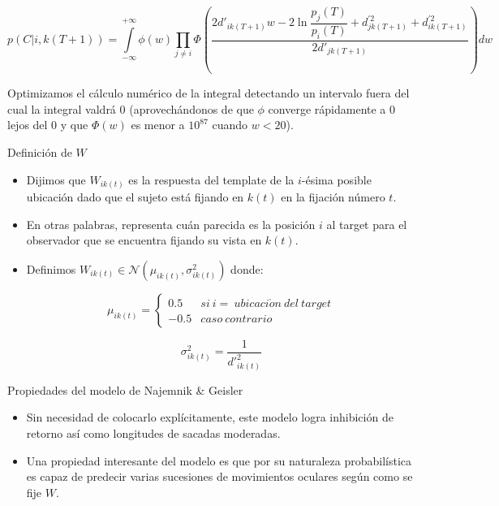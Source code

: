 \documentclass[compress]{beamer}
\begin{document}
\begin{frame}


{\footnotesize
$$p(C | i, k(T+1)) = \int\limits_{-\infty}^{+\infty}\phi(w) \prod\limits_{j \neq i} \Phi\left(\dfrac{2d'_{ik(T+1)} w -2\ln\dfrac{p_j(T)}{p_i(T)} + d_{jk(T+1)}^{\prime 2} + d_{ik(T+1)}^{\prime 2}}{2d'_{jk(T+1)}} \right) dw$$}

Optimizamos el cálculo numérico de la integral detectando un intervalo fuera del cual la integral valdrá 0 (aprovechándonos de que $\phi$ converge rápidamente a 0 lejos del 0 y que $\Phi(w)$ es menor a $10^{87}$ cuando $w < 20$).
\end{frame}

\begin{frame}{Definición de $W$}
\begin{itemize}
\item Dijimos que $W_{ik(t)}$ es la respuesta del template de la $i$-ésima posible ubicación dado que el sujeto está fijando en $k(t)$ en la fijación número $t$. 

\item En otras palabras, representa cuán parecida es la posición $i$ al target para el observador que se encuentra fijando su vista en $k(t)$. 
\item Definimos $W_{ik(t)} \in \mathcal{N}(\mu_{ik(t)}, \sigma^2_{ik(t)})$ donde:

$$ \mu_{ik(t)}
= \left\{ \begin{array}{lc}
             0.5 &  si \ i = \ ubicaci\acute{o}n \ del \ target \\
             -0.5 &  caso \ contrario 
          \end{array}
   \right.$$

$$ \sigma^2_{ik(t)} = \displaystyle\frac{1}{d'^2_{ik(t)}}$$ 
\end{itemize}
\end{frame}

\begin{frame}{Propiedades del modelo de Najemnik \& Geisler}
\begin{itemize}
\item Sin necesidad de colocarlo explícitamente, este modelo logra inhibición de retorno así como longitudes de sacadas moderadas. 
\item Una propiedad interesante del modelo es que por su naturaleza probabilística es capaz de predecir varias sucesiones de movimientos oculares según como se fije $W$.
\end{itemize}
\end{frame}
\end{document}
